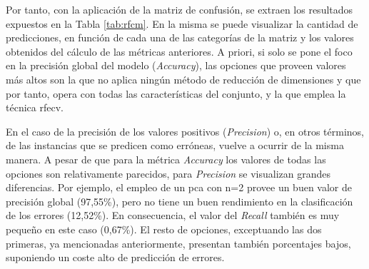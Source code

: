 \vspace{3mm}

Por tanto, con la aplicación de la matriz de confusión, se extraen los resultados expuestos en la Tabla \ref{tab:rfcm}. En la misma se puede visualizar la cantidad de predicciones, en función de cada una de las categorías de la matriz y los valores obtenidos del cálculo de las métricas anteriores. A priori, si solo se pone el foco en la precisión global del modelo (\textit{Accuracy}), las opciones que proveen valores más altos son la que no aplica ningún método de reducción de dimensiones y que por tanto, opera con todas las características del conjunto, y la que emplea la técnica \gls{rfecv}. 

\vspace{3mm}

En el caso de la precisión de los valores positivos (\textit{Precision}) o, en otros términos, de las instancias que se predicen como erróneas, vuelve a ocurrir de la misma manera. A pesar de que para la métrica \textit{Accuracy} los valores de todas las opciones son relativamente parecidos, para \textit{Precision} se visualizan grandes diferencias. Por ejemplo, el empleo de un \gls{pca} con n=2 provee un buen valor de precisión global (97,55\%), pero no tiene un buen rendimiento en la clasificación de los errores (12,52\%). En consecuencia, el valor del \textit{Recall} también es muy pequeño en este caso (0,67\%). El resto de opciones, exceptuando las dos primeras, ya mencionadas anteriormente, presentan también porcentajes bajos, suponiendo un coste alto de predicción de errores. 

\vspace{3mm}

